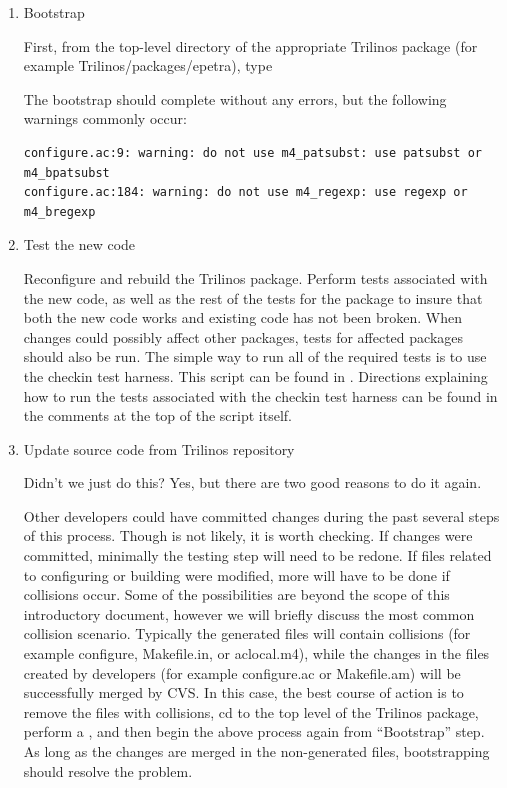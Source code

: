 \documentclass[12pt,relax]{TrilinosDevGuide}
\begin{document}
\begin{enumerate}
\item Bootstrap

First, from the top-level directory of the appropriate Trilinos package (for 
example Trilinos/packages/epetra), type 


The bootstrap should complete without any errors, but the following warnings 
commonly occur:

\begin{verbatim}
configure.ac:9: warning: do not use m4_patsubst: use patsubst or m4_bpatsubst
configure.ac:184: warning: do not use m4_regexp: use regexp or m4_bregexp
\end{verbatim}

\item Test the new code

Reconfigure and rebuild the Trilinos package.  Perform tests associated with 
the new code, as well as the rest of the tests for the package to insure that 
both the new code works and existing code has not been broken.  When changes 
could possibly affect other packages, tests for affected packages should also 
be run.  The simple way to run all of the required tests is to use the 
checkin test harness.  This script can be found in 
.  Directions 
explaining how to run the tests associated with the checkin test harness can 
be found in the comments at the top of the script itself.

\item Update source code from Trilinos repository

Didn't we just do this?  Yes, but there are two good reasons to do it again.

Other developers could have committed changes during the past several 
steps of this process.  Though is not likely, it is worth checking.  If 
changes were committed, minimally the testing step will need to be redone.  
If files related to configuring or building were modified, more will have to 
be done if collisions occur.  Some of the possibilities are beyond the scope 
of this introductory document, however we will briefly discuss the most 
common collision scenario.  Typically the generated files will contain 
collisions (for example configure, Makefile.in, or aclocal.m4), while the 
changes in the files created by developers (for example configure.ac or 
Makefile.am) will be successfully merged by CVS.  In this case, the best 
course of action is to remove the files with collisions, cd to the top level 
of the Trilinos package, perform a , and then begin 
the above process again from ``Bootstrap'' step.  As long as the changes are 
merged in the non-generated files, bootstrapping should resolve the problem.


\end{enumerate}
\end{document}
